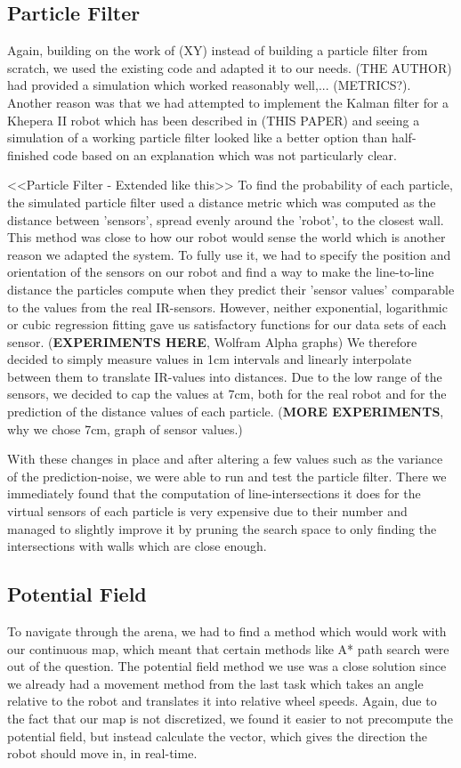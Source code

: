 \documentclass[paper=a4, fontsize=12pt]{scrartcl}	%
\numberwithin{equation}{section}		%
\numberwithin{figure}{section}			%
\numberwithin{table}{section}				%
\begin{document}
\subsection{Particle Filter}
Again, building on the work of (XY) instead of building a particle filter from scratch, we used the existing code and adapted it to our needs. (THE AUTHOR) had provided a simulation which worked reasonably well,... (METRICS?). Another reason was that we had attempted to implement the Kalman filter for a Khepera II robot which has been described in (THIS PAPER) and seeing a simulation of a working particle filter looked like a better option than half-finished code based on an explanation which was not particularly clear.

<<Particle Filter  - Extended like this>>
To find the probability of each particle, the simulated particle filter used a distance metric which was computed as the distance between 'sensors', spread evenly around the 'robot', to the closest wall. This method was close to how our robot would sense the world which is another reason we adapted the system. To fully use it, we had to specify the position and orientation of the sensors on our robot and find a way to make the line-to-line distance the particles compute when they predict their 'sensor values' comparable to the values from the real IR-sensors.  However, neither exponential, logarithmic or cubic regression fitting gave us satisfactory functions for our data sets of each sensor. (\textbf{EXPERIMENTS HERE}, Wolfram Alpha graphs) We therefore decided to simply measure values in 1cm intervals and linearly interpolate between them to translate IR-values into distances. Due to the low range of the sensors, we decided to cap the values at 7cm, both for the real robot and for the prediction of the distance values of each particle. (\textbf{MORE EXPERIMENTS}, why we chose 7cm, graph of sensor values.)

With these changes in place and after altering a few values such as the variance of the prediction-noise, we were able to run and test the particle filter. There we immediately found that the computation of line-intersections it does for the virtual sensors of each particle is very expensive due to their number and managed to slightly improve it by pruning the search space to only finding the intersections with walls which are close enough.

\subsection{Potential Field}
To navigate through the arena, we had to find a method which would work with our continuous map, which meant that certain methods like A* path search were out of the question. The potential field method we use was a close solution since we already had a movement method from the last task which takes an angle relative to the robot and translates it into relative wheel speeds. Again, due to the fact that our map is not discretized, we found it easier to not precompute the potential field, but instead calculate the vector, which gives the direction the robot should move in, in real-time.
\end{document}
